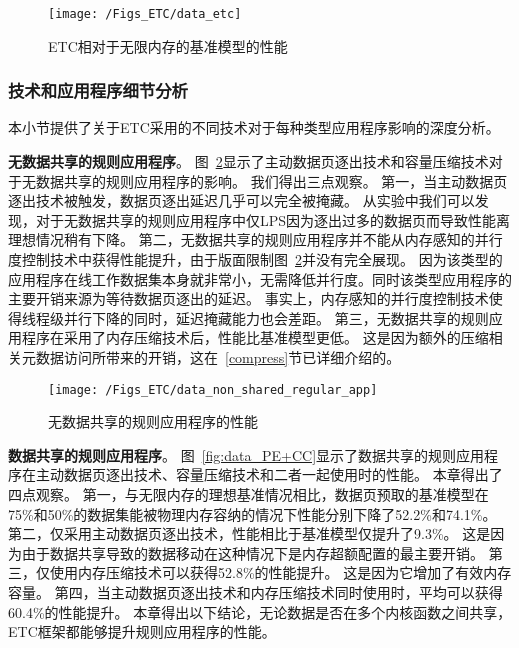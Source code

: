 \begin{figure}[htbp] %
  \centering
  \texttt{[image: /Figs\_ETC/data\_etc]}
  \caption{ETC相对于无限内存的基准模型的性能}
  \label{fig:data_etc}
\end{figure}

\subsubsection{技术和应用程序细节分析}

本小节提供了关于ETC采用的不同技术对于每种类型应用程序影响的深度分析。

\textbf{无数据共享的规则应用程序}。
图~\ref{fig:data_non_shared_regular_app}显示了主动数据页逐出技术和容量压缩技术对于无数据共享的规则应用程序的影响。
我们得出三点观察。
第一，当主动数据页逐出技术被触发，数据页逐出延迟几乎可以完全被掩藏。
从实验中我们可以发现，对于无数据共享的规则应用程序中仅LPS因为逐出过多的数据页而导致性能离理想情况稍有下降。
第二，无数据共享的规则应用程序并不能从内存感知的并行度控制技术中获得性能提升，由于版面限制图~\ref{fig:data_non_shared_regular_app}并没有完全展现。
因为该类型的应用程序在线工作数据集本身就非常小，无需降低并行度。同时该类型应用程序的主要开销来源为等待数据页逐出的延迟。
事实上，内存感知的并行度控制技术使得线程级并行下降的同时，延迟掩藏能力也会差距。
第三，无数据共享的规则应用程序在采用了内存压缩技术后，性能比基准模型更低。
这是因为额外的压缩相关元数据访问所带来的开销，这在~\ref{compress}节已详细介绍的。


\begin{figure}[htbp] %
  \centering
  \texttt{[image: /Figs\_ETC/data\_non\_shared\_regular\_app]}
  \caption{无数据共享的规则应用程序的性能}
  \label{fig:data_non_shared_regular_app}
\end{figure}

\textbf{数据共享的规则应用程序}。
图~\ref{fig:data_PE+CC}显示了数据共享的规则应用程序在主动数据页逐出技术、容量压缩技术和二者一起使用时的性能。
本章得出了四点观察。
第一，与无限内存的理想基准情况相比，数据页预取的基准模型在75\%和50\%的数据集能被物理内存容纳的情况下性能分别下降了52.2\%和74.1\%。
第二，仅采用主动数据页逐出技术，性能相比于基准模型仅提升了9.3\%。
这是因为由于数据共享导致的数据移动在这种情况下是内存超额配置的最主要开销。
第三，仅使用内存压缩技术可以获得52.8\%的性能提升。
这是因为它增加了有效内存容量。
第四，当主动数据页逐出技术和内存压缩技术同时使用时，平均可以获得60.4\%的性能提升。
本章得出以下结论，无论数据是否在多个内核函数之间共享，ETC框架都能够提升规则应用程序的性能。

